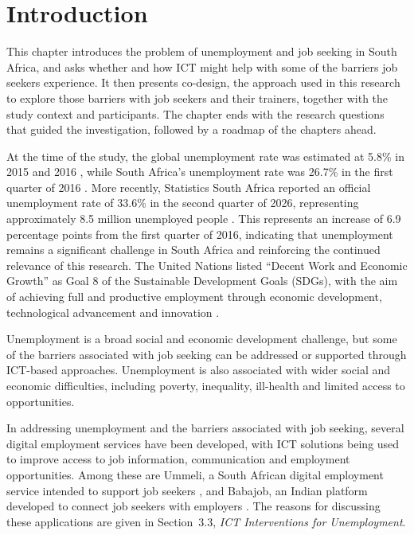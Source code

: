 \chapter{Introduction}

\begin{chapterintro}
This chapter introduces the problem of unemployment and job seeking in South Africa, and asks whether and how ICT might help with some of the barriers job seekers experience. It then presents co-design, the approach used in this research to explore those barriers with job seekers and their trainers, together with the study context and participants. The chapter ends with the research questions that guided the investigation, followed by a roadmap of the chapters ahead.
\end{chapterintro}

At the time of the study, the global unemployment rate was estimated at 5.8\% in 2015 and 2016 \cite{ilo2016}, while South Africa's unemployment rate was 26.7\% in the first quarter of 2016 \cite{statssa2016q1}. More recently, Statistics South Africa reported an official unemployment rate of 33.6\% in the second quarter of 2026, representing approximately 8.5 million unemployed people \cite{statssa2026}. This represents an increase of 6.9 percentage points from the first quarter of 2016, indicating that unemployment remains a significant challenge in South Africa and reinforcing the continued relevance of this research. The United Nations listed ``Decent Work and Economic Growth'' as Goal 8 of the Sustainable Development Goals (SDGs), with the aim of achieving full and productive employment through economic development, technological advancement and innovation \cite{unsdg8}.

Unemployment is a broad social and economic development challenge, but some of the barriers associated with job seeking can be addressed or supported through ICT-based approaches. Unemployment is also associated with wider social and economic difficulties, including poverty, inequality, ill-health and limited access to opportunities.

In addressing unemployment and the barriers associated with job seeking, several digital employment services have been developed, with ICT solutions being used to improve access to job information, communication and employment opportunities. Among these are Ummeli, a South African digital employment service intended to support job seekers \cite{gitau2012}, and Babajob, an Indian platform developed to connect job seekers with employers \cite{babajob2016}. The reasons for discussing these applications are given in Section~3.3, \textit{ICT Interventions for Unemployment}.

